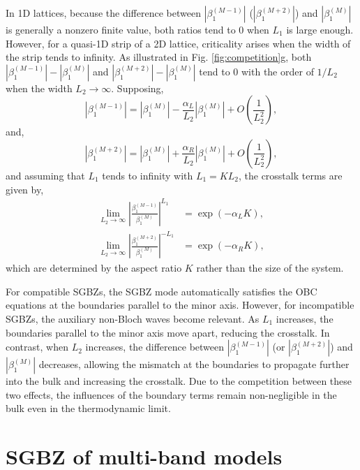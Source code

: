 In 1D lattices, because the difference between $|\beta_{1}^{(M-1)}|$
($|\beta_{1}^{(M+2)}|$) and $|\beta_{1}^{(M)}|$ is generally a nonzero
finite value, both ratios tend to $0$ when $L_{1}$ is large enough.
However, for a quasi-1D strip of a 2D lattice, criticality arises
when the width of the strip tends to infinity. As illustrated in Fig.
\ref{fig:competition}g, both $|\beta_{1}^{(M-1)}|-|\beta_{1}^{(M)}|$
and $|\beta_{1}^{(M+2)}|-|\beta_{1}^{(M)}|$ tend to $0$ with the
order of $1/L_{2}$ when the width $L_{2}\rightarrow\infty$. Supposing,
\begin{equation}
|\beta_{1}^{(M-1)}|=|\beta_{1}^{(M)}|-\frac{\alpha_{L}}{L_{2}}|\beta_{1}^{(M)}|+O\left(\frac{1}{L_{2}^{2}}\right),
\end{equation}
and, 
\begin{equation}
|\beta_{1}^{(M+2)}|=|\beta_{1}^{(M)}|+\frac{\alpha_{R}}{L_{2}}|\beta_{1}^{(M)}|+O\left(\frac{1}{L_{2}^{2}}\right),
\end{equation}
and assuming that $L_{1}$ tends to infinity with $L_{1}=KL_{2}$,
the crosstalk terms are given by, 
\begin{align}
\lim_{L_{2}\rightarrow\infty}\left|\frac{\beta_{1}^{(M-1)}}{\beta_{1}^{(M)}}\right|^{L_{1}} & =\exp\left(-\alpha_{L}K\right),\label{eq:crosstalk-left}\\
\lim_{L_{2}\rightarrow\infty}\left|\frac{\beta_{1}^{(M+2)}}{\beta_{1}^{(M)}}\right|^{-L_{1}} & =\exp\left(-\alpha_{R}K\right),\label{eq:crosstalk-right}
\end{align}
which are determined by the aspect ratio $K$ rather than the size
of the system.

For compatible SGBZs, the SGBZ mode automatically satisfies the OBC
equations at the boundaries parallel to the minor axis. However, for
incompatible SGBZs, the auxiliary non-Bloch waves become relevant.
As $L_{1}$ increases, the boundaries parallel to the minor axis move
apart, reducing the crosstalk. In contrast, when $L_{2}$ increases,
the difference between $|\beta_{1}^{(M-1)}|$ (or $|\beta_{1}^{(M+2)}|$)
and $|\beta_{1}^{(M)}|$ decreases, allowing the mismatch at the boundaries
to propagate further into the bulk and increasing the crosstalk. Due
to the competition between these two effects, the influences of the
boundary terms remain non-negligible in the bulk even in the thermodynamic
limit.

\section{SGBZ of multi-band models}

